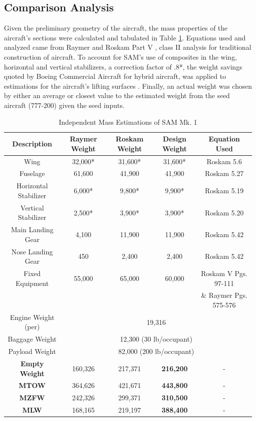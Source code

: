 \subsection{Comparison Analysis}
\label{subsection: comparison}
Given the preliminary geometry of the aircraft, the mass properties of the aircraft's sections were calculated and tabulated in Table \ref{tab:mass_props}. Equations used and analyzed came from Raymer \cite{raymer} and Roskam Part V \cite{roskam_5}, class II analysis for traditional construction of aircraft. To account for SAM's use of composites in the wing, horizontal and vertical stabilizers, a correction factor of .8*, the weight savings quoted by Boeing Commercial Aircraft for hybrid aircraft, was applied to estimations for the aircraft's lifting surfaces \cite{bcacomposite}.  Finally, an actual weight was chosen by either an average or closest value to the estimated weight from the seed aircraft (777-200) given the seed inputs.

\begin{table}[!h]
\centering
\caption{Independent Mass Estimations of SAM Mk. 1}
\begin{tabular}{|c||c|c|c|c| }
\toprule
\multicolumn{1}{|c||}{\textbf{Description}} & \multicolumn{1}{c|}{\textbf{Raymer Weight}} &  
 \textbf{Roskam Weight} & \textbf{Design Weight} & \textbf{Equation Used} \\ \hline \hline 
Wing & 32,000* & 31,600* & 31,600* & Roskam 5.6  \cite{roskam_5} \\ \hline
Fuselage & 61,600 & 41,900 & 41,900 & Roskam 5.27  \cite{roskam_5} \\ \hline
Horizontal Stabilizer & 6,000* & 9,800* & 9,900* & Roskam 5.19 \cite{roskam_5} \\ \hline
Vertical Stabilizer & 2,500* & 3,900* & 3,900* & Roskam 5.20 \cite{roskam_5} \\ \hline
Main Landing Gear & 4,100 & 11,900 & 11,900 & Roskam 5.42  \cite{roskam_5} \\ \hline
Nose Landing Gear & 450 &2,400 & 2,400 & Roskam 5.42  \cite{roskam_5} \\ \hline
Fixed Equipment & 55,000 & 65,000 & 60,000 & Roskam V Pgs. 97-111 \cite{roskam_5}  \\
& & & & \& Raymer Pgs. 575-576 \cite{raymer} \\ \hline
Engine Weight (per) &  \multicolumn{4}{|c|}{19,316}   \\ \hline
Baggage Weight & \multicolumn{4}{|c|}{12,300 (30 lb/occupant) }  \\ \hline
Payload Weight & \multicolumn{4}{|c|}{82,000 (200 lb/occupant) }  \\ \hline \hline
\textbf{Empty Weight} & 160,326 & 217,371 & \textbf{216,200} & -\\ \hline
\textbf{MTOW} & 364,626 & 421,671 & \textbf{443,800}  & - \\ \hline
\textbf{MZFW} & 242,326 & 299,371 & \textbf{310,500}  & - \\ \hline
\textbf{MLW} & 168,165 & 219,197 & \textbf{388,400} & - \\
\bottomrule
\end{tabular}
\label{tab:mass_props}
\end{table}
\FloatBarrier

